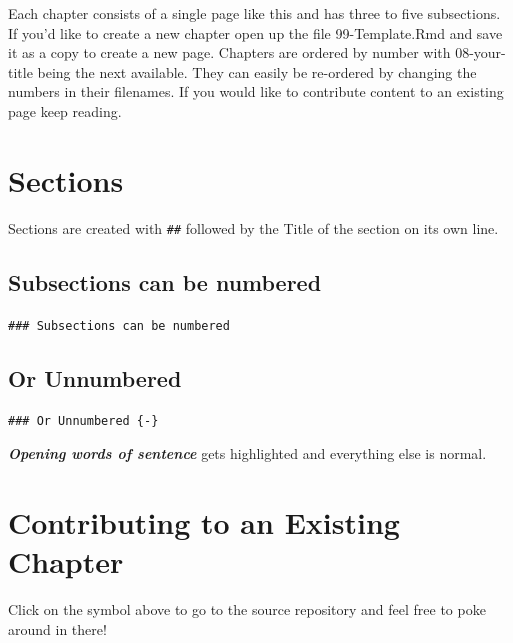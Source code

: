 \documentclass[
  12pt, openany]{book}
\makeatletter
\newenvironment{kframe}{%
\medskip{}
\setlength{\fboxsep}{.8em}
 \def\at@end@of@kframe{}%
 \ifinner\ifhmode%
  \def\at@end@of@kframe{\end{minipage}}%
  \begin{minipage}{\columnwidth}%
 \fi\fi%
 \def\FrameCommand##1{\hskip\@totalleftmargin \hskip-\fboxsep
 \colorbox{shadecolor}{##1}\hskip-\fboxsep
     \hskip-\linewidth \hskip-\@totalleftmargin \hskip\columnwidth}%
 \MakeFramed {\advance\hsize-\width
   \@totalleftmargin\z@ \linewidth\hsize
   \@setminipage}}%
 {\par\unskip\endMakeFramed%
 \at@end@of@kframe}
\newenvironment{rmdblock}[1]
  {
  \begin{itemize}
  \renewcommand{\labelitemi}{
    \raisebox{-.7\height}[0pt][0pt]{
      {\setkeys{Gin}{width=3em,keepaspectratio}\texttt{[image: img/\#1]}}
    }
  }
  \setlength{\fboxsep}{1em}
  \begin{kframe}
  \item
  }
  {
  \end{kframe}
  \end{itemize}
  }
\newenvironment{important}
  {\begin{rmdblock}{important}}
  {\end{rmdblock}}
\makeatother
\begin{document}
\begin{center}

\begin{argument}

Each chapter consists of a single page like this and has three to five subsections. If you'd like to create a new chapter open up the file 99-Template.Rmd and save it as a copy to create a new page. Chapters are ordered by number with 08-your-title being the next available. They can easily be re-ordered by changing the numbers in their filenames. If you would like to contribute content to an existing page keep reading.

\end{argument}

\end{center}

\hypertarget{sections}{%
\section{Sections}\label{sections}}

Sections are created with \texttt{\#\#} followed by the Title of the section on its own line.

\hypertarget{subsections-can-be-numbered}{%
\subsection{Subsections can be numbered}\label{subsections-can-be-numbered}}

\texttt{\#\#\#\ Subsections\ can\ be\ numbered}

\hypertarget{or-unnumbered}{%
\subsection*{Or Unnumbered}\label{or-unnumbered}}


\texttt{\#\#\#\ Or\ Unnumbered\ \{-\}}

\textbf{\emph{Opening words of sentence}} gets highlighted and everything else is normal.

\hypertarget{contributing-to-an-existing-chapter}{%
\section{Contributing to an Existing Chapter}\label{contributing-to-an-existing-chapter}}

\begin{important}

Click on the symbol above to go to the source repository and feel free to poke around in there!

\end{important}
\end{document}
